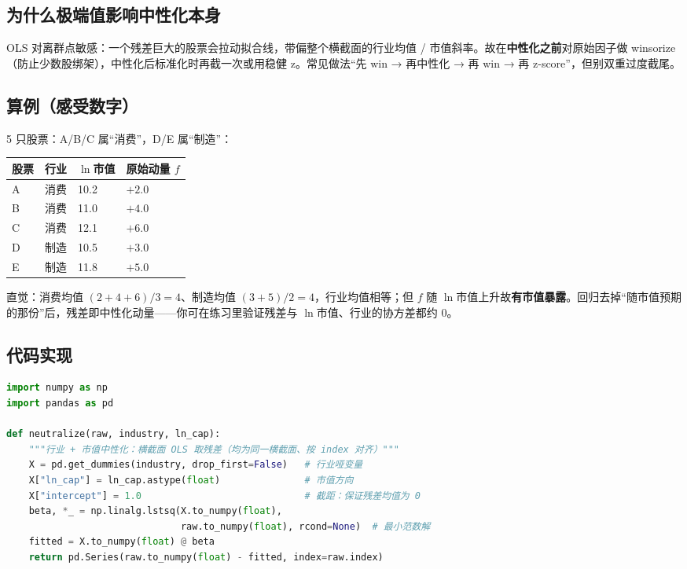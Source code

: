 \documentclass[UTF8,11pt]{ctexart}
\begin{document}
\subsection{为什么极端值影响中性化本身}
OLS 对离群点敏感：一个残差巨大的股票会拉动拟合线，带偏整个横截面的行业均值 / 市值斜率。故在\textbf{中性化之前}对原始因子做 winsorize（防止少数股绑架），中性化后标准化时再截一次或用稳健 z。常见做法“先 win → 再中性化 → 再 win → 再 z-score”，但别双重过度截尾。

\subsection{算例（感受数字）}
5 只股票：A/B/C 属“消费”，D/E 属“制造”：
\begin{center}
\renewcommand{\arraystretch}{1.3}
\begin{tabular}{@{}llll@{}}
\toprule
股票 & 行业 & $\ln$市值 & 原始动量 $f$ \\
\midrule
A & 消费 & 10.2 & $+2.0$ \\
B & 消费 & 11.0 & $+4.0$ \\
C & 消费 & 12.1 & $+6.0$ \\
D & 制造 & 10.5 & $+3.0$ \\
E & 制造 & 11.8 & $+5.0$ \\
\bottomrule
\end{tabular}
\end{center}
直觉：消费均值 $(2+4+6)/3=4$、制造均值 $(3+5)/2=4$，行业均值相等；但 $f$ 随 $\ln$市值上升故\textbf{有市值暴露}。回归去掉“随市值预期的那份”后，残差即中性化动量——你可在练习里验证残差与 $\ln$市值、行业的协方差都约 $0$。

\subsection{代码实现}
\begin{lstlisting}[language=Python]
import numpy as np
import pandas as pd

def neutralize(raw, industry, ln_cap):
    """行业 + 市值中性化：横截面 OLS 取残差（均为同一横截面、按 index 对齐）"""
    X = pd.get_dummies(industry, drop_first=False)   # 行业哑变量
    X["ln_cap"] = ln_cap.astype(float)               # 市值方向
    X["intercept"] = 1.0                             # 截距：保证残差均值为 0
    beta, *_ = np.linalg.lstsq(X.to_numpy(float),
                               raw.to_numpy(float), rcond=None)  # 最小范数解
    fitted = X.to_numpy(float) @ beta
    return pd.Series(raw.to_numpy(float) - fitted, index=raw.index)
\end{lstlisting}
\end{document}
